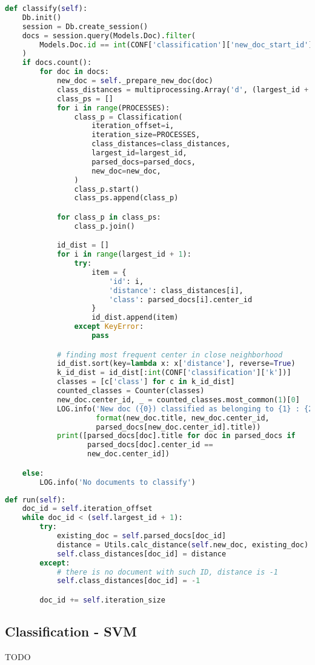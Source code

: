 \begin{lstlisting}[language=Python, caption={Main.classify() - Main process method for conducting kNN classification}, label={lst:main:classify}]
def classify(self):
    Db.init()
    session = Db.create_session()
    docs = session.query(Models.Doc).filter(
        Models.Doc.id == int(CONF['classification']['new_doc_start_id'])
    )
    if docs.count():
        for doc in docs:
            new_doc = self._prepare_new_doc(doc)
            class_distances = multiprocessing.Array('d', (largest_id + 1))
            class_ps = []
            for i in range(PROCESSES):
                class_p = Classification(
                    iteration_offset=i,
                    iteration_size=PROCESSES,
                    class_distances=class_distances,
                    largest_id=largest_id,
                    parsed_docs=parsed_docs,
                    new_doc=new_doc,
                )
                class_p.start()
                class_ps.append(class_p)

            for class_p in class_ps:
                class_p.join()

            id_dist = []
            for i in range(largest_id + 1):
                try:
                    item = {
                        'id': i,
                        'distance': class_distances[i],
                        'class': parsed_docs[i].center_id
                    }
                    id_dist.append(item)
                except KeyError:
                    pass

            # finding most frequent center in close neighborhood
            id_dist.sort(key=lambda x: x['distance'], reverse=True)
            k_id_dist = id_dist[:int(CONF['classification']['k'])]
            classes = [c['class'] for c in k_id_dist]
            counted_classes = Counter(classes)
            new_doc.center_id, _ = counted_classes.most_common(1)[0]
            LOG.info('New doc ({0}) classified as belonging to {1} : {2}'.
                     format(new_doc.title, new_doc.center_id,
                     parsed_docs[new_doc.center_id].title))
            print([parsed_docs[doc].title for doc in parsed_docs if
                   parsed_docs[doc].center_id ==
                   new_doc.center_id])

    else:
        LOG.info('No documents to classify')
\end{lstlisting}

\begin{lstlisting}[language=Python, caption={Classification.run() - Classification class process main method}, label={lst:classification:run}]
def run(self):
    doc_id = self.iteration_offset
    while doc_id < (self.largest_id + 1):
        try:
            existing_doc = self.parsed_docs[doc_id]
            distance = Utils.calc_distance(self.new_doc, existing_doc)
            self.class_distances[doc_id] = distance
        except:
            # there is no document with such ID, distance is -1
            self.class_distances[doc_id] = -1

        doc_id += self.iteration_size
\end{lstlisting}

\subsection{Classification - SVM}
TODO

